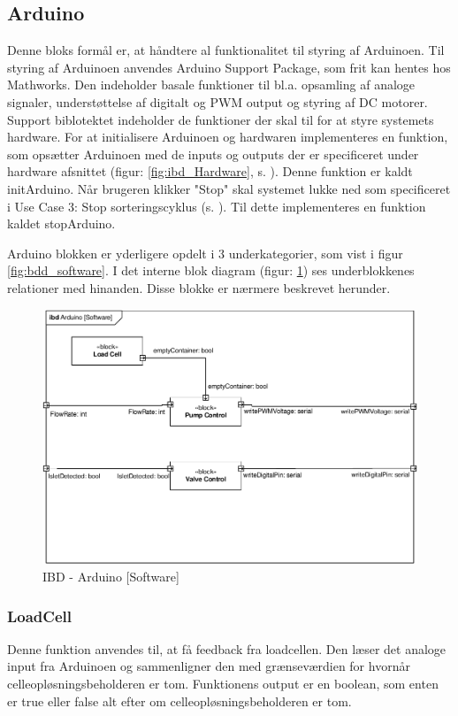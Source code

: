 \subsection{Arduino}
Denne bloks formål er, at håndtere al funktionalitet til styring af Arduinoen. Til styring af Arduinoen anvendes Arduino Support Package, som frit kan hentes hos Mathworks. Den indeholder basale funktioner til bl.a. opsamling af analoge signaler, understøttelse af digitalt og PWM output og styring af DC motorer. Support biblotektet indeholder de funktioner der skal til for at styre systemets hardware.
For at initialisere Arduinoen og hardwaren implementeres en funktion, som opsætter Arduinoen med de inputs og outputs der er specificeret under hardware afsnittet (figur: \ref{fig:ibd_Hardware}, s. \pageref{fig:ibd_Hardware}). Denne funktion er kaldt initArduino. Når brugeren klikker "Stop" skal systemet lukke ned som specificeret i Use Case 3: Stop sorteringscyklus (s. \pageref{uc:3}). Til dette implementeres en funktion kaldet stopArduino. 

\newpage

Arduino blokken er yderligere opdelt i 3 underkategorier, som vist i figur \ref{fig:bdd_software}. I det interne blok diagram (figur: \ref{fig:ibd_software_arduino}) ses underblokkenes relationer med hinanden. Disse blokke er nærmere beskrevet herunder.  
\begin{figure}[H]
	\centering
	\includegraphics[width=1\textwidth]{billeder/IBD_Software_Arduino-crop.pdf}
	\caption{IBD - Arduino [Software]}
	\label{fig:ibd_software_arduino}
\end{figure}
\subsubsection{LoadCell}
Denne funktion anvendes til, at få feedback fra loadcellen. Den læser det analoge input fra Arduinoen og sammenligner den med grænseværdien for hvornår celleopløsningsbeholderen er tom. Funktionens output er en boolean, som enten er true eller false alt efter om celleopløsningsbeholderen er tom.
